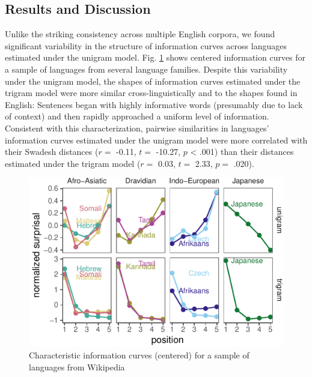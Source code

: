 \documentclass[10pt, letterpaper]{article}
\newenvironment{CodeChunk}{}{}
\begin{document}
\hypertarget{results-and-discussion-2}{%
\subsection{Results and Discussion}\label{results-and-discussion-2}}

Unlike the striking consistency across multiple English corpora, we
found significant variability in the structure of information curves
across languages estimated under the unigram model. Fig.
\ref{fig:diff-languages} shows centered information curves for a sample
of languages from several language families. Despite this variability
under the unigram model, the shapes of information curves estimated
under the trigram model were more similar cross-linguistically and to
the shapes found in English: Sentences began with highly informative
words (presumably due to lack of context) and then rapidly approached a
uniform level of information. Consistent with this characterization,
pairwise similarities in languages' information curves estimated under
the unigram model were more correlated with their Swadesh distances
(\(r =\) -0.11, \(t =\) -10.27, \(p\) \textless{} .001) than their
distances estimated under the trigram model (\(r =\) 0.03, \(t =\) 2.33,
\(p =\) .020).

\begin{CodeChunk}
\begin{figure}[tb]
\includegraphics{figs/diff-languages-1} \caption[Characteristic information curves (centered) for a sample of languages from Wikipedia]{Characteristic information curves (centered) for a sample of languages from Wikipedia}\label{fig:diff-languages}
\end{figure}
\end{CodeChunk}
\end{document}
